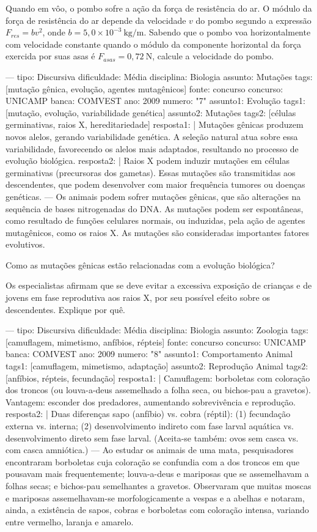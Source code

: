 \questionitem
Quando em vôo, o pombo sofre a ação da força de resistência do ar. O módulo da força de resistência do ar depende da velocidade \(v\) do pombo segundo a expressão \(F_{res} = bv^{2}\), onde \(b = 5{,}0 \times 10^{-3}\ \text{kg/m}\). Sabendo que o pombo voa horizontalmente com velocidade constante quando o módulo da componente horizontal da força exercida por suas asas é \(F_{asas} = 0{,}72\ \text{N}\), calcule a velocidade do pombo.

\setquestion
---
tipo: Discursiva
dificuldade: Média
disciplina: Biologia
assunto: Mutações
tags: [mutação gênica, evolução, agentes mutagênicos]
fonte: concurso
concurso: UNICAMP
banca: COMVEST
ano: 2009
numero: "7"
assunto1: Evolução
tags1: [mutação, evolução, variabilidade genética]
assunto2: Mutações
tags2: [células germinativas, raios X, hereditariedade]
resposta1: |
  Mutações gênicas produzem novos alelos, gerando variabilidade genética. A seleção natural atua sobre
  essa variabilidade, favorecendo os alelos mais adaptados, resultando no processo de evolução biológica.
resposta2: |
  Raios X podem induzir mutações em células germinativas (precursoras dos gametas). Essas mutações são
  transmitidas aos descendentes, que podem desenvolver com maior frequência tumores ou doenças genéticas.
---
Os animais podem sofrer mutações gênicas, que são alterações na sequência de bases nitrogenadas do DNA. As mutações podem ser espontâneas, como resultado de funções celulares normais, ou induzidas, pela ação de agentes mutagênicos, como os raios X. As mutações são consideradas importantes fatores evolutivos.

\questionitem
Como as mutações gênicas estão relacionadas com a evolução biológica?

\questionitem
Os especialistas afirmam que se deve evitar a excessiva exposição de crianças e de jovens em fase reprodutiva aos raios X, por seu possível efeito sobre os descendentes. Explique por quê.

\setquestion
---
tipo: Discursiva
dificuldade: Média
disciplina: Biologia
assunto: Zoologia
tags: [camuflagem, mimetismo, anfíbios, répteis]
fonte: concurso
concurso: UNICAMP
banca: COMVEST
ano: 2009
numero: "8"
assunto1: Comportamento Animal
tags1: [camuflagem, mimetismo, adaptação]
assunto2: Reprodução Animal
tags2: [anfíbios, répteis, fecundação]
resposta1: |
  Camuflagem: borboletas com coloração dos troncos (ou louva-a-deus assemelhado a folha seca, ou
  bichos-pau a gravetos). Vantagem: esconder dos predadores, aumentando sobrevivência e reprodução.
resposta2: |
  Duas diferenças sapo (anfíbio) vs. cobra (réptil): (1) fecundação externa vs. interna;
  (2) desenvolvimento indireto com fase larval aquática vs. desenvolvimento direto sem fase larval.
  (Aceita-se também: ovos sem casca vs. com casca amniótica.)
---
Ao estudar os animais de uma mata, pesquisadores encontraram borboletas cuja coloração se confundia com a dos troncos em que pousavam mais frequentemente; louva-a-deus e mariposas que se assemelhavam a folhas secas; e bichos-pau semelhantes a gravetos. Observaram que muitas moscas e mariposas assemelhavam-se morfologicamente a vespas e a abelhas e notaram, ainda, a existência de sapos, cobras e borboletas com coloração intensa, variando entre vermelho, laranja e amarelo.

